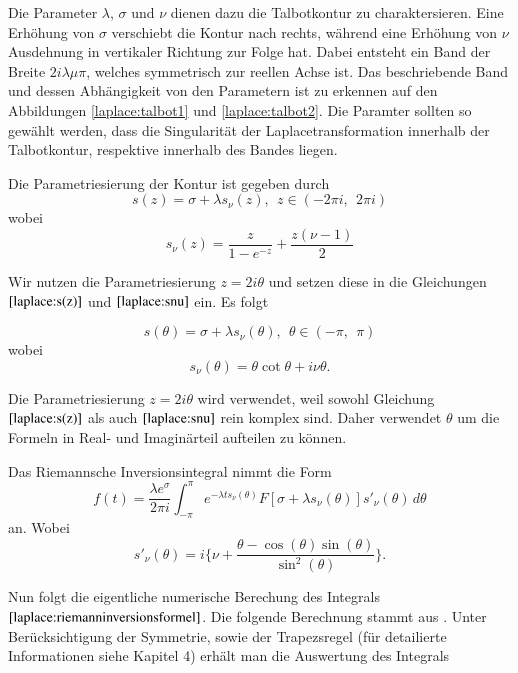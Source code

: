 Die Parameter $\lambda$, $\sigma$ und $\nu$ dienen dazu die
Talbotkontur zu charaktersieren. Eine Erhöhung von $\sigma$ verschiebt
die Kontur nach rechts, während eine Erhöhung von $\nu$ Ausdehnung
in vertikaler Richtung zur Folge hat. Dabei entsteht ein Band der Breite $2i\lambda\mu\pi$, welches symmetrisch zur reellen Achse ist. Das beschriebende Band und dessen Abhängigkeit von den Parametern ist zu erkennen auf den Abbildungen \ref{laplace:talbot1} und \ref{laplace:talbot2}. Die Paramter sollten so gewählt werden, dass die Singularität der Laplacetransformation innerhalb der Talbotkontur, respektive innerhalb des Bandes liegen. 


Die Parametriesierung der Kontur ist gegeben durch
\begin{equation}
s(z) = \sigma+\lambda s_{\nu}(z),~~ z\in (-2\pi i,~~2\pi i)
\label{laplace:s(z)}
\end{equation}
wobei
\begin{equation}
s_{\nu}(z)=\frac{z}{1-e^{-z}}+\frac{z(\nu-1)}{2}
\label{laplace:snu}
\end{equation}

Wir nutzen die Parametriesierung $z=2i\theta$ und setzen diese in die Gleichungen $\eqref{laplace:s(z)}$ und $\eqref{laplace:snu}$ ein. Es folgt

\begin{equation}
s(\theta) = \sigma+\lambda s_{\nu}(\theta),~~ \theta\in (-\pi ,~~\pi)
\end{equation}
wobei
\begin{equation}
s_{\nu}(\theta)=\theta \cot\theta+i\nu\theta.
\end{equation}

Die Parametriesierung $z=2i\theta$ wird verwendet, weil sowohl Gleichung $\eqref{laplace:s(z)}$ als auch $\eqref{laplace:snu}$ rein komplex sind. Daher verwendet $\theta$ um die Formeln in Real- und Imaginärteil aufteilen zu können.

Das Riemannsche Inversionsintegral nimmt die Form 
\begin{equation}
f(t)=\frac{\lambda e^{\sigma}}{2\pi i}\int_{-\pi}^{\pi} e^{-\lambda ts_{\nu}(\theta)}F[\sigma + \lambda s_{\nu}(\theta)]s'_{\nu}(\theta)\,d\theta
\end{equation}
an.
Wobei
\begin{equation}
s'_{\nu}(\theta) = i \Biggl\{\nu + \frac{\theta-\cos(\theta)\sin(\theta)}{\sin^{2}(\theta)}  \Biggr\}.
\end{equation}


Nun folgt die eigentliche numerische Berechung des Integrals $\eqref{laplace:riemanninversionsformel}$. Die folgende Berechnung stammt aus \cite{laplace:talbot}. Unter Berücksichtigung der Symmetrie, sowie der Trapezsregel (für detailierte Informationen siehe Kapitel 4) erhält man die Auswertung des Integrals

